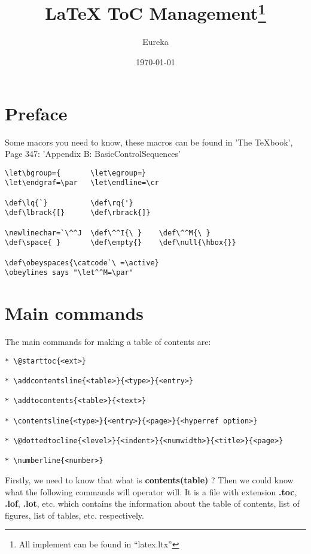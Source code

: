 \documentclass{article}
\title{\LaTeX{} ToC Management\footnote{All implement can be found in ``latex.ltx''}}
\author{Eureka}
\date{\today}
\begin{document}
\maketitle
\tableofcontents
\newpage

\section{Preface}
Some macors you need to know, these macros can be found in 'The TeXbook', Page 347: 'Appendix B: BasicControlSequences'
\begin{lstlisting}
\let\bgroup={       \let\egroup=}
\let\endgraf=\par   \let\endline=\cr

\def\lq{`}          \def\rq{'}      
\def\lbrack{[}      \def\rbrack{]}

\newlinechar=`\^^J  \def\^^I{\ }    \def\^^M{\ }
\def\space{ }       \def\empty{}    \def\null{\hbox{}}

\def\obeyspaces{\catcode`\ =\active}
\obeylines says "\let^^M=\par"
\end{lstlisting}

\section{Main commands}
The main commands for making a table of contents are:

\begin{lstlisting}
* \@starttoc{<ext>}

* \addcontentsline{<table>}{<type>}{<entry>} 

* \addtocontents{<table>}{<text>}

* \contentsline{<type>}{<entry>}{<page>}{<hyperref option>}

* \@dottedtocline{<level>}{<indent>}{<numwidth>}{<title>}{<page>}

* \numberline{<number>}
\end{lstlisting}

Firstly, we need to know that what is \textbf{contents(table)} ? Then we could know what the following commands will operator will. 
It is a file with extension \textbf{.toc}, \textbf{.lof}, \textbf{.lot}, etc. which contains the information 
about the table of contents, list of figures, list of tables, etc. respectively.
\end{document}

